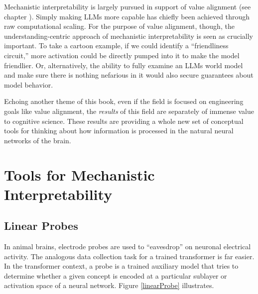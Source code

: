 Mechanistic interpretability is largely pursued in support of value alignment
(see chapter ). Simply making LLMs more capable has
chiefly been achieved through raw computational scaling. For the purpose of
value alignment, though, the understanding-centric approach of mechanistic
interpretability is seen as crucially important. To take a cartoon example, if
we could identify a ``friendliness circuit,'' more activation could be directly
pumped into it to make the model friendlier. Or, alternatively, the ability to
fully examine an LLMs world model and make sure there is nothing nefarious in
it would also secure guarantees about model behavior.

Echoing another theme of this book, even if the field is focused on engineering
goals like value alignment, the \emph{results} of this field are separately of
immense value to cognitive science. These results are providing a whole new set
of conceptual tools for thinking about how information is processed in the
natural neural networks of the brain.

\section{Tools for Mechanistic Interpretability}

\subsection{Linear Probes}

In animal brains, electrode probes are used to ``eavesdrop'' on neuronal
electrical activity. The analogous data collection task for a trained
transformer is far easier. In the transformer context, a probe is a trained
auxiliary model that tries to determine whether a given concept is encoded at a
particular sublayer or activation space of a neural network. Figure
\ref{linearProbe} illustrates.

